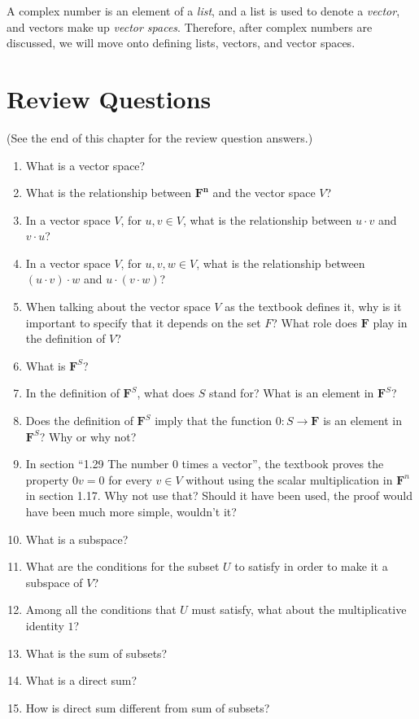 \documentclass[12pt, letterpaper, oneside]{book}
\begin{document}
A complex number is an element of a \emph{list}, and a list is used to denote a
\emph{vector}, and vectors make up \emph{vector spaces}. Therefore, after
complex numbers are discussed, we will move onto defining lists, vectors, and
vector spaces.

\section{Review Questions}

(See the end of this chapter for the review question answers.)

\begin{enumerate}
  \item What is a vector space?
  \item What is the relationship between $\mathbf{F^n}$ and the vector space
    $V$?
  \item In a vector space $V$, for $u, v \in V$, what is the relationship
    between $u \cdot v$ and $v \cdot u$?
  \item In a vector space $V$, for $u, v, w \in V$, what is the relationship
  between $(u \cdot v) \cdot w$ and $u \cdot (v \cdot w)$?
  \item When talking about the vector space $V$ as the textbook defines it, why
    is it important to specify that it depends on the set $F$? What role does
    $\mathbf{F}$ play in the definition of $V$?
  \item What is $\mathbf{F}^S$?
  \item In the definition of $\mathbf{F}^S$, what does $S$ stand for? What is
    an element in $\mathbf{F}^S$?
  \item Does the definition of $\mathbf{F}^S$ imply that the function
    $0: S \rightarrow \mathbf{F}$ is an element in $\mathbf{F}^S$? Why or why
    not?
  \item In section ``1.29 The number 0 times a vector'', the textbook proves
    the property $0v = 0$ for every $v \in V$ without using the scalar
    multiplication in $\mathbf{F}^n$ in section 1.17. Why not use that? Should
    it have been used, the proof would have been much more simple, wouldn't it?
  \item What is a subspace?
  \item What are the conditions for the subset $U$ to satisfy in order to make
    it a subspace of $V$?
  \item Among all the conditions that $U$ must satisfy, what about the
    multiplicative identity $1$?
  \item What is the sum of subsets?
  \item What is a direct sum?
  \item How is direct sum different from sum of subsets?
\end{enumerate}
\end{document}
